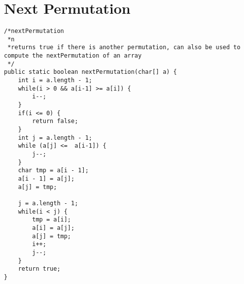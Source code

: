 \documentclass[10pt,a4paper]{article}
\begin{document}
\section{Next Permutation}
\begin{lstlisting}
/*nextPermutation
 *n
 *returns true if there is another permutation, can also be used to compute the nextPermutation of an array
 */
public static boolean nextPermutation(char[] a) {
    int i = a.length - 1;
    while(i > 0 && a[i-1] >= a[i]) {
        i--;
    }
    if(i <= 0) {
        return false;
    }
    int j = a.length - 1;
    while (a[j] <=  a[i-1]) {
        j--;
    }
    char tmp = a[i - 1];
    a[i - 1] = a[j];
    a[j] = tmp;
      
    j = a.length - 1;
    while(i < j) {
        tmp = a[i];
        a[i] = a[j];
        a[j] = tmp;
        i++;
        j--;
    }
    return true;
}
\end{lstlisting}
\end{document}
